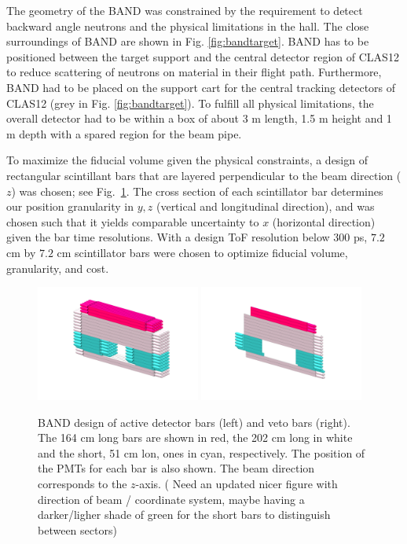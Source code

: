 \documentclass[3p,final,twocolumn]{elsarticle}
\begin{document}
The geometry of the BAND was constrained by the requirement to detect backward angle neutrons and the physical limitations in the hall. 
The close surroundings of BAND are shown in Fig. \ref{fig:bandtarget}. BAND has to be positioned between the target support and the central detector region of CLAS12 to reduce scattering of neutrons on material in their flight path. Furthermore, BAND had to be placed on the support cart for the central tracking detectors of CLAS12 (grey in Fig. \ref{fig:bandtarget}). 
To fulfill all physical limitations, the overall detector had to be within a box of about 3 \si{\meter} length, 1.5 \si{\meter} height and 1 \si{\meter} depth with a spared region for the beam pipe.

To maximize the fiducial volume given the physical constraints, a design of rectangular scintillant bars that are layered perpendicular to the beam direction ($z$) was chosen; see Fig.~\ref{fig:design}.
The cross section of each scintillator bar determines our position granularity in $y,z$ (vertical and longitudinal direction), and was chosen such that it yields comparable uncertainty to $x$ (horizontal direction) given the bar 
time resolutions. With a design ToF resolution below $300$ \si{\pico\second}, $7.2$ \si{\centi\meter} by $7.2$ \si{\centi\meter} scintillator bars were chosen to optimize
fiducial volume, granularity, and cost. 

\begin{figure}[tbh!]
	\centering
		\includegraphics[width=0.48\textwidth]{MAIN_DETECTOR_COLORED_2.png}
		\includegraphics[width=0.48\textwidth]{VETO_DETECTOR_COLORED_2.png}
		\caption{BAND design	of active detector bars (left) and veto bars (right). The 164 \si{\centi\meter} long bars are shown in red, the 202 \si{\centi\meter} long in white and the short, 51 \si{\centi\meter} lon, ones in cyan, respectively. The position of the PMTs for each bar is also shown. The beam direction corresponds to the $z$-axis. ({\color{red} Need an updated nicer figure with direction of beam / coordinate system, maybe having a darker/ligher shade of green for the short bars to distinguish between sectors})      }
		\label{fig:design}
\end{figure}
\end{document}
